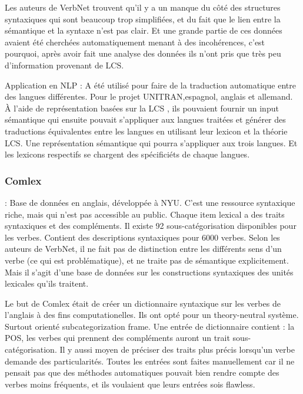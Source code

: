 Les auteurs de VerbNet trouvent qu'il y a un manque du côté des structures syntaxiques qui sont beaucoup trop simplifiées, et du fait que le lien entre la sémantique et la syntaxe n'est pas clair. Et une grande partie de ces données avaient été cherchées automatiquement menant à des incohérences, c'est pourquoi, après avoir fait une analyse des données ils n'ont pris que très peu d'information provenant de LCS.\citep{SchulerVerbnetBroadcoverageComprehensive2005}

Application en NLP : A été utilisé pour faire de la traduction automatique entre des langues différentes\citep{DorrUseLexicalSemantics1992}.  Pour le projet UNITRAN,espagnol, anglais et allemand. À l'aide de représentation basées sur la LCS , ils pouvaient fournir un input sémantique qui ensuite pouvait s'appliquer aux langues traitées et générer des traductions équivalentes entre les langues en utilisant leur lexicon et la théorie LCS. Une représentation sémantique qui pourra s'appliquer aux trois langues. Et les lexicons respectifs se chargent des spécificiéts de chaque langues.

\subsubsection{Comlex} : Base de données en anglais, développée à NYU. C'est une ressource syntaxique riche, mais qui n'est pas accessible au public. Chaque item lexical a des traits syntaxiques et  des compléments. Il existe 92 sous-catégorisation disponibles pour les verbes. Contient des descriptions syntaxiques pour 6000 verbes.  Selon les auteurs de VerbNet, il ne fait pas de distinction entre les différents sens d'un verbe (ce qui est problématique), et ne traite pas de sémantique explicitement. Mais il s'agit d'une base de données sur les constructions syntaxiques des unités lexicales qu'ils traitent.

Le but de Comlex était de \citep{Grishman:1994:CSB:991886.991931} créer un dictionnaire syntaxique sur les verbes de l'anglais à des fins computationelles. Ils ont opté pour un theory-neutral système. Surtout orienté subcategorization frame. Une entrée de dictionnaire contient :  la POS, les verbes qui prennent des compléments auront un trait sous-catégorisation. Il y aussi moyen de préciser des traits plus précis lorsqu'un verbe demande des particularités. Toutes les entrées sont faites manuellement car il ne pensait pas que des méthodes automatiques pouvait bien rendre compte des verbes moins fréquents, et ils voulaient que leurs entrées sois flawless.

